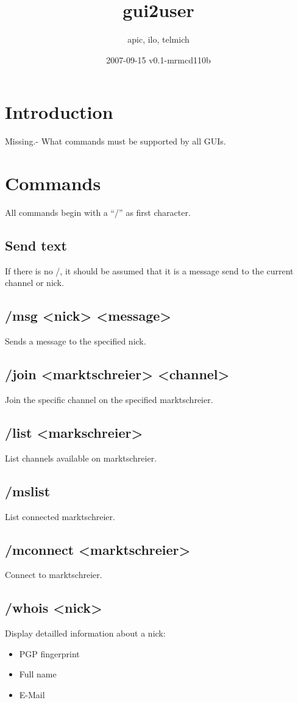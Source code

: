 \documentclass[12pt,a4paper]{article}
\begin{document}
\title{gui2user}
\date{2007-09-15 v0.1-mrmcd110b}
\author{apic, ilo, telmich}

\section{Introduction}
Missing.- What commands must be supported by all GUIs.

\section{Commands}
All commands begin with a "`/"' as first character.

\subsection{Send text}
If there is no /, it should be assumed that it is a message send to the current channel or nick.

\subsection{/msg <nick> <message>}
Sends a message to the specified nick.

\subsection{/join <marktschreier> <channel>}
Join the specific channel on the specified marktschreier.

\subsection{/list <markschreier>}
List channels available on marktschreier.

\subsection{/mslist}
List connected marktschreier.

\subsection{/mconnect <marktschreier>}
Connect to marktschreier.

\subsection{/whois <nick>}
Display detailled information about a nick:
\begin{itemize}
\item PGP fingerprint
\item Full name
\item E-Mail
\end{itemize}
\end{document}
